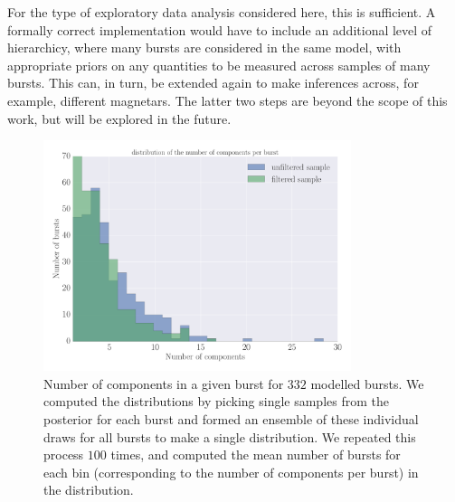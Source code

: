 \documentclass[12pt]{emulateapj}
\begin{document}
For the type of exploratory data analysis considered here, this is sufficient. A formally correct implementation would have to include an additional level of hierarchicy,
where many bursts are considered in the same model, with appropriate priors on any quantities to be measured across samples of many bursts. This can, in turn,
be extended again to make inferences across, for example, different magnetars. The latter two steps are beyond the scope of this work, but will be explored in the future.


\begin{figure}[htbp]
\begin{center}
\includegraphics[width=9cm]{f6.pdf}%
\caption{Number of components in a given burst for $332$ modelled bursts. We computed the distributions by picking single samples
from the posterior for each burst and formed an ensemble of these individual draws for all bursts to make a single distribution. We repeated this process $100$ times,
and computed the mean number of bursts for each bin (corresponding to the number of components per burst) in the distribution.}
\label{fig:spikes}
\end{center}
\end{figure}
\end{document}
